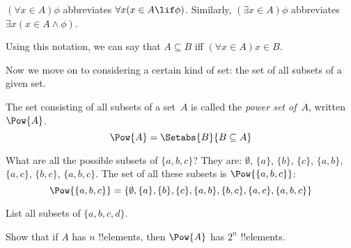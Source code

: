 \documentclass[../../../include/open-logic-section]{subfiles}
\begin{document}
\begin{defn}
$(\forall x \in A)\phi$ abbreviates $\forall x(x \in A \lif
\phi)$. Similarly, $(\exists x \in A)\phi$ abbreviates $\exists x(x
\in A \land \phi)$. 
\end{defn}

Using this notation, we can say that $A \subseteq B$ iff $(\forall
x \in A)x \in B$. 

Now we move on to considering a certain kind of set: the set of all
subsets of a given set. 

\begin{defn}
The set consisting of all subsets of a set~$A$ is called the
\emph{power set of}~$A$, written $\Pow{A}$.
  \[
    \Pow{A} = \Setabs{B}{B \subseteq A} 
  \]
\end{defn}

\begin{ex}
What are all the possible subsets of $\{ a, b, c \}$? They are:
$\emptyset$, $\{a \}$, $\{b\}$, $\{c\}$, $\{a, b\}$, $\{a, c\}$, $\{b,
c\}$, $\{a, b, c\}$. The set of all these subsets is
$\Pow{\{a,b,c\}}$:
\[
\Pow{\{ a, b, c \}} = \{\emptyset, \{a \}, \{b\}, \{c\}, \{a, b\},
\{b, c\}, \{a, c\}, \{a, b, c\}\}
\]
\end{ex}

\begin{prob}
List all subsets of $\{a, b, c, d\}$.
\end{prob}

\begin{prob}
Show that if $A$ has $n$ !!{element}s, then $\Pow{A}$ has $2^n$
!!{element}s.
\end{prob}
\end{document}

